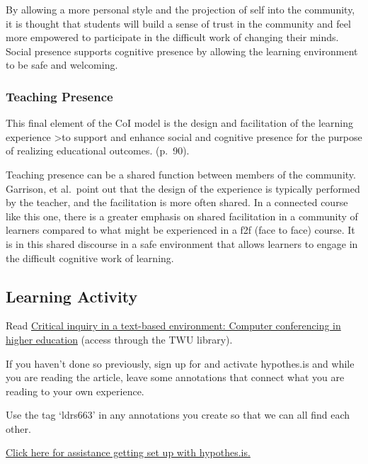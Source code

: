 \documentclass[
]{book}
\begin{document}
By allowing a more personal style and the projection of self into the community, it is thought that students will build a sense of trust in the community and feel more empowered to participate in the difficult work of changing their minds. Social presence supports cognitive presence by allowing the learning environment to be safe and welcoming.

\hypertarget{teaching-presence}{%
\subsubsection*{Teaching Presence}\label{teaching-presence}}

This final element of the CoI model is the design and facilitation of the learning experience
\textgreater to support and enhance social and cognitive presence for the purpose of realizing educational outcomes. (p.~90).

Teaching presence can be a shared function between members of the community. Garrison, et al.~point out that the design of the experience is typically performed by the teacher, and the facilitation is more often shared. In a connected course like this one, there is a greater emphasis on shared facilitation in a community of learners compared to what might be experienced in a f2f (face to face) course. It is in this shared discourse in a safe environment that allows learners to engage in the difficult cognitive work of learning.

\hypertarget{learning-activity}{%
\subsection*{Learning Activity}\label{learning-activity}}

Read \href{https://www.sciencedirect.com/science/article/pii/S1096751600000166}{Critical inquiry in a text-based environment: Computer conferencing in higher education} (access through the TWU library).

If you haven't done so previously, sign up for and activate hypothes.is and while you are reading the article, leave some annotations that connect what you are reading to your own experience.

Use the tag `ldrs663' in any annotations you create so that we can all find each other.

\href{http://create.twu.ca/help/other-web-tools/hypothesis}{Click here for assistance getting set up with hypothes.is.}
\end{document}
